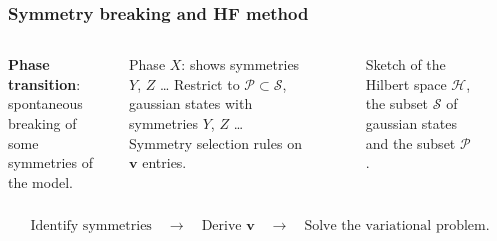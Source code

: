 \def\SectionFolder{sections/hf}
\begin{frame}
	\frametitle{Symmetry breaking and HF method}
	\begin{columns}	
		\textbf{Phase transition}: spontaneous breaking of some symmetries of the model. \medskip
		
		Phase $X$: shows symmetries $Y$, $Z$ \dots
		\DownImplication
		Restrict to $\mathcal{P} \subset \mathcal{S}$, gaussian states with symmetries $Y$, $Z$ \dots
		\DownImplication
		Symmetry selection rules on $\mathbf{v}$ entries.
		\begin{figure}
			\centering
			\resizebox{\columnwidth}{!}{}
			\label{fig:H-S-P}
			\caption{Sketch of the Hilbert space $\mathcal{H}$, the subset $\mathcal{S}$ of gaussian states and the subset $\mathcal{P}$.}
		\end{figure}
	\end{columns}
	
	\vfil
	
	\[
		\text{Identify symmetries}
		\quad\to\quad
		\text{Derive $\mathbf{v}$}
		\quad\to\quad
		\text{Solve the variational problem.}
	\]
	
\end{frame}


